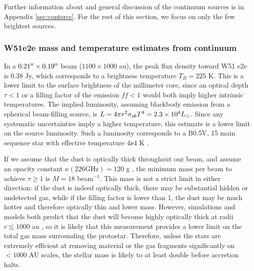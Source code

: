 \documentclass{emulateapj}
\begin{document}
Further information about and general discussion of the continuum sources is 
in Appendix \ref{sec:contsrcs}.  For the rest of this section, we focus
on only the few brightest sources.








\subsubsection{W51e2e mass and temperature estimates from continuum}
\label{sec:W51e2e}

In a $0.21\mbox{$^{\prime\prime}$}\times0.19\mbox{$^{\prime\prime}$}$ beam ($1100\times1000$ au), the peak flux
density toward W51 e2e is 0.38 Jy, which corresponds to a brightness
temperature $T_B=225$ K.  This is a lower limit to the surface brightness of
the millimeter core, since an optical depth $\tau<1$ or a filling factor of the
emission $ff<1$ would both imply higher intrinsic temperatures.  The implied
luminosity, assuming blackbody emission from a spherical beam-filling source,
is $L = 4\pi r^2 \sigma_{sb} T^4 = 2.3\times10^{4} L_{\odot}$.  Since any systematic
uncertainties imply a higher temperature, this estimate is a lower limit on the
source luminosity.  Such a luminosity corresponds to a B0.5V, 15 \msun main
sequence star with effective temperature $4\ee{4}$ K \citep[][see
Section \ref{sec:stellarproperties} for further discussion of
stellar types]{Pecaut2013a}.


If we assume that the dust is optically thick throughout our beam, and assume
an opacity constant $\kappa(226 \mathrm{GHz})=120$ g \persc, the minimum mass
per beam to achieve $\tau\geq1$ is $M=18$ \msun beam$^{-1}$.  This  mass is not
a strict limit in either direction: if the dust is indeed optically thick,
there may be substantial hidden or undetected gas, while if the filling factor
is lower than 1, the dust may be much hotter and therefore optically thin and
lower  mass.  However, simulations and models both predict that the dust will
become highly optically thick at radii $r\lesssim1000$ au
\citep{Forgan2016a,Klassen2016a}, so it is likely that this measurement
provides  a lower limit on the total gas mass surrounding the protostar.
Therefore, unless the stars are extremely efficient at removing material or the
gas fragments significantly on $<1000$ AU scales, the stellar mass is likely to
at least double before accretion halts.
\end{document}
